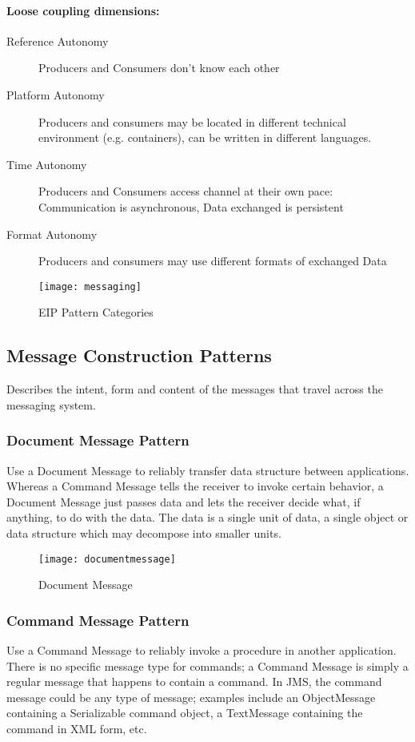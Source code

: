 \paragraph{Loose coupling dimensions:}
\begin{description}
	\item [Reference Autonomy] Producers and Consumers don't know each other
	\item [Platform Autonomy] Producers and consumers may be located in different technical environment (e.g. containers), can be written in different languages.
	\item [Time Autonomy] Producers and Consumers access channel at their own pace: Communication is asynchronous, Data exchanged is persistent
	\item [Format Autonomy] Producers and consumers may use different formats of exchanged Data
\end{description}

\begin{figure}[H]
  \center
  \texttt{[image: messaging]}
  \caption{EIP Pattern Categories}
\end{figure}

\pagebreak

\subsection{Message Construction Patterns}
Describes the intent, form and content of the messages that travel across the messaging system. 

\subsubsection{Document Message Pattern}
Use a Document Message to reliably transfer data structure between applications. Whereas a Command Message tells the receiver to invoke certain behavior, a Document Message just passes data and lets the receiver decide what, if anything, to do with the data. The data is a single unit of data, a single object or data structure which may decompose into smaller units.

\begin{figure}[H]
  \center
  \texttt{[image: documentmessage]}
  \caption{Document Message}
\end{figure}

\subsubsection{Command Message Pattern}
Use a Command Message to reliably invoke a procedure in another application. There is no specific message type for commands; a Command Message is simply a regular message that happens to contain a command. In JMS, the command message could be any type of message; examples include an ObjectMessage containing a Serializable command object, a TextMessage containing the command in XML form, etc.

